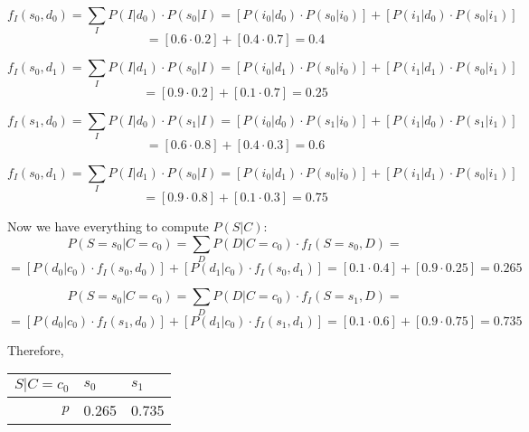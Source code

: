 \documentclass[11pt,a4paper]{article}
\begin{document}
$$ f_I(s_0,d_0) = \sum_{I}P(I|d_0)\cdot P(s_0|I) = [P(i_0|d_0) \cdot  P(s_0|i_0)] + [P(i_1|d_0) \cdot  P(s_0|i_1)] $$
$$ = [0.6\cdot 0.2] + [0.4\cdot 0.7] = 0.4 $$

$$ f_I(s_0,d_1) = \sum_{I}P(I|d_1)\cdot P(s_0|I) = [P(i_0|d_1) \cdot  P(s_0|i_0)] + [P(i_1|d_1) \cdot  P(s_0|i_1)] $$
$$ = [0.9\cdot 0.2] + [0.1\cdot 0.7] = 0.25 $$

$$ f_I(s_1,d_0) = \sum_{I}P(I|d_0)\cdot P(s_1|I)
 = [P(i_0|d_0) \cdot  P(s_1|i_0)] + [P(i_1|d_0) \cdot P(s_1|i_1)] $$
$$ = [0.6\cdot 0.8] + [0.4\cdot 0.3] = 0.6 $$

$$ f_I(s_0,d_1) = \sum_{I}P(I|d_1)\cdot P(s_0|I)
 = [P(i_0|d_1) \cdot  P(s_0|i_0)] + [P(i_1|d_1) \cdot P(s_0|i_1)] $$
$$ = [0.9\cdot 0.8] + [0.1\cdot 0.3] = 0.75 $$

Now we have everything to compute $P(S|C)$:
$$ P(S=s_0|C=c_0) = \sum_{D}P(D|C=c_0)\cdot f_I(S=s_0,D) =
 $$ $$ = [P(d_0|c_0)\cdot f_I(s_0,d_0)] + [P(d_1|c_0)\cdot f_I(s_0,d_1)] = [0.1\cdot 0.4]+[0.9\cdot 0.25] = 0.265 $$

$$ P(S=s_0|C=c_0) = \sum_{D}P(D|C=c_0)\cdot f_I(S=s_1,D) =
 $$ $$ = [P(d_0|c_0)\cdot f_I(s_1,d_0)] + [P(d_1|c_0)\cdot f_I(s_1,d_1)]  = [0.1\cdot 0.6]+[0.9\cdot 0.75] = 0.735 $$

Therefore, 
\begin{center}
	\begin{tabular}{r | ll}
		\toprule
		$S|C=c_0$ & $s_0$ & $s_1$ \\
		\midrule
		$ p $ &  0.265 & 0.735 \\
		\bottomrule
	\end{tabular}
\end{center}
\end{document}
